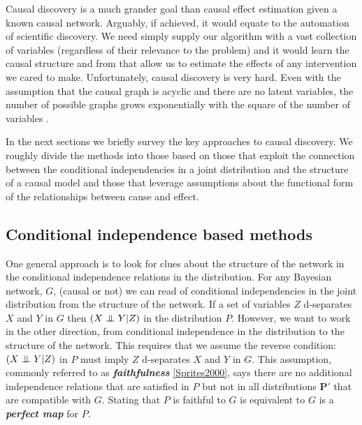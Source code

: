 \documentclass[11pt,a4paper,oneside]{book}
\theoremstyle{plain}
\theoremstyle{definition}
\newcommand{\ci}{\mathrel{\perp\mspace{-10mu}\perp}}
\begin{document}

Causal discovery is a much grander goal than causal effect estimation given a known causal network. Arguably, if achieved, it would equate to the automation of scientific discovery. We need simply supply our algorithm with a vast collection of variables (regardless of their relevance to the problem) and it would learn the causal structure and from that allow us to estimate the effects of any intervention we cared to make. Unfortunately, causal discovery is very hard. Even with the assumption that the causal graph is acyclic and there are no latent variables, the number of possible graphs grows exponentially with the square of the number of variables .


In the next sections we briefly survey the key approaches to causal discovery. We roughly divide the methods into those based on those that exploit the connection between the conditional independencies in a joint distribution and the structure of a causal model and those that leverage assumptions about the functional form of the relationships between cause and effect. 


\subsection{Conditional independence based methods}
One general approach is to look for clues about the structure of the network in the conditional independence relations in the distribution. For any Bayesian network, $G$, (causal or not) we can read of conditional independencies in the joint distribution from the structure of the network. If a set of variables $Z$ d-separates $X$ and $Y$ in $G$ then $(X \ci Y|Z)$ in the distribution $P$. However, we want to work in the other direction, from conditional independence in the distribution to the structure of the network. This requires that we assume the reverse condition: $(X \ci Y|Z)$ in $P$ must imply $Z$ d-separates $X$ and $Y$ in $G$. This assumption, commonly referred to as  \textbf{\textit{faithfulness}} \ref{Sprites2000}, says there are no additional independence relations that are satisfied in $P$ but not in all distributions $\boldsymbol{P'}$ that are compatible with $G$. Stating that $P$ is faithful to $G$ is equivalent to $G$ is a \textbf{\textit{perfect map}} \citep{pearl1988probabilistic} for $P$.
\end{document}
